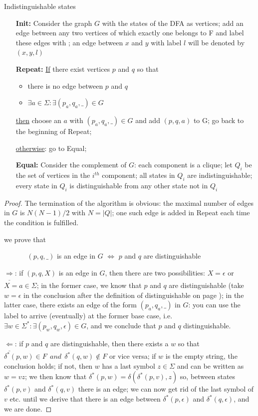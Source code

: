 \begin{algo} Indistinguishable states \label{gelijketoestanden}
\begin{enumerate}
\item[{\bf Init:}]
Consider the graph $G$ with the states of the DFA as vertices; add an
edge between any two vertices of which exactly one belongs to F and
label these edges with \eps; an edge between $x$ and $y$ with label
$l$ will be denoted by $(x,y,l)$


\item[{\bf Repeat:}]
\underline{If} there exist vertices $p$ and $q$ so that
\begin{itemize}
\item there is no edge between $p$ and $q$
\item $\exists a \in \Sigma: \exists (p_a,q_a,\_) \in G$
\end{itemize}
\underline{then} choose an $a$ with $(p_a,q_a,\_) \in G$
and add $(p,q,a)$ to G; go back to the beginning of Repeat;

\underline{otherwise}: go to Equal;

\item[{\bf Equal:}]
Consider the complement of $G$: each component is a clique; let $Q_i$
be the set of vertices in the $i^{th}$ component; all states in $Q_i$
are indistinguishable; every state in $Q_i$ is distinguishable from
any other state not in $Q_i$

\end{enumerate}

\end{algo}
\begin{proof}
The termination of the algorithm is obvious: the maximal number of
edges in $G$ is $N(N-1)/2$ with $N=|Q|$; one such edge is added in
Repeat each time the condition is fulfilled.

we prove that


$~~~~~~~~~~~~~~~(p,q,\_)$ is an edge in $G$ $\Longleftrightarrow$ $p$ and $q$ are distinguishable


$\underline{\Longrightarrow}$: if $(p,q,X)$ is an edge in $G$, then
there are two possibilities: $X = \epsilon$ or $X = a \in \Sigma$; in
the former case, we know that $p$ and $q$ are distinguishable (take
$w = \epsilon$ in the conclusion after the definition of
distinguishable on page \pageref{gelijk}); in the latter case, there
exists an edge of the form $(p_a,q_a,\_)$ in $G$: you can use the
label to arrive (eventually) at the former base case, i.e.
%
$\exists w \in \Sigma^* : \exists (p_w,q_w,\epsilon) \in G$, and we
conclude that $p$ and $q$ distinguishable.

$\underline{\Longleftarrow}$: if $p$ and $q$ are distinguishable, then
there exists a $w$ so that $\delta^*(p,w) \in F~~and~~\delta^*(q,w)
\notin F$ or vice versa; if $w$ is the empty string, the conclusion
holds; if not, then $w$ has a last symbol $z \in \Sigma$ and can be
written as $w = vz$; we then know that $\delta^*(p,w) =
\delta(\delta^*(p,v),z)$ so, between states $\delta^*(p,v)$ and
$\delta^*(q,v)$ there is an edge; we can now get rid of the last
symbol of $v$ etc. until we derive that there is an edge between
$\delta^*(p,\epsilon)$ and $\delta^*(q,\epsilon)$, and we are done.
\end{proof}

